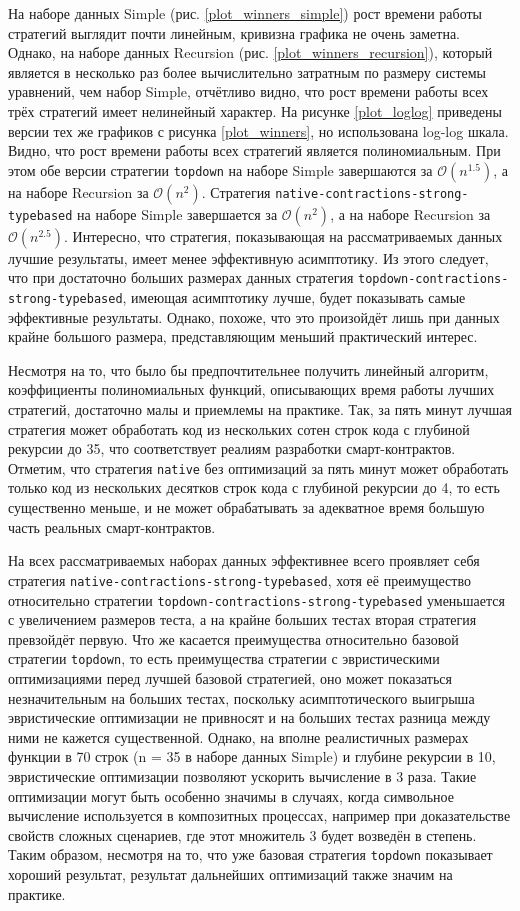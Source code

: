 \documentclass[../thesis.tex]{subfiles}
\begin{document}
На наборе данных Simple (рис. \ref{plot_winners_simple}) рост времени работы стратегий выглядит почти линейным, кривизна графика не очень заметна. Однако, на наборе данных Recursion (рис. \ref{plot_winners_recursion}), который является в несколько раз более вычислительно затратным по размеру системы уравнений, чем набор Simple, отчётливо видно, что рост времени работы всех трёх стратегий имеет нелинейный характер. На рисунке \ref{plot_loglog} приведены версии тех же графиков с рисунка \ref{plot_winners}, но использована log-log шкала. Видно, что рост времени работы всех стратегий является полиномиальным. При этом обе версии стратегии \texttt{topdown} на наборе Simple завершаются за $\mathcal{O}(n^{1.5})$, а на наборе Recursion за $\mathcal{O}(n^2)$. Стратегия \texttt{native-contractions-strong-typebased} на наборе Simple завершается за $\mathcal{O}(n^2)$, а на наборе Recursion за $\mathcal{O}(n^{2.5})$. Интересно, что стратегия, показывающая на рассматриваемых данных лучшие результаты, имеет менее эффективную асимптотику. Из этого следует, что при достаточно больших размерах данных стратегия \texttt{topdown-contractions-strong-typebased}, имеющая асимптотику лучше, будет показывать самые эффективные результаты. Однако, похоже, что это произойдёт лишь при данных крайне большого размера, представляющим меньший практический интерес.

Несмотря на то, что было бы предпочтительнее получить линейный алгоритм, коэффициенты полиномиальных функций, описывающих время работы лучших стратегий, достаточно малы и приемлемы на практике. Так, за пять минут лучшая стратегия может обработать код из нескольких сотен строк кода с глубиной рекурсии до 35, что соответствует реалиям разработки смарт-контрактов. Отметим, что стратегия \texttt{native} без оптимизаций за пять минут может обработать только код из нескольких десятков строк кода с глубиной рекурсии до 4, то есть существенно меньше, и не может обрабатывать за адекватное время большую часть реальных смарт-контрактов.

На всех рассматриваемых наборах данных эффективнее всего проявляет себя стратегия \texttt{native-contractions-strong-typebased}, хотя её преимущество относительно стратегии \texttt{topdown-contractions-strong-typebased} уменьшается с увеличением размеров теста, а на крайне больших тестах вторая стратегия превзойдёт первую. Что же касается преимущества относительно базовой стратегии \texttt{topdown}, то есть преимущества стратегии с эвристическими оптимизациями перед лучшей базовой стратегией, оно может показаться незначительным на больших тестах, поскольку асимптотического выигрыша эвристические оптимизации не привносят и на больших тестах разница между ними не кажется существенной. Однако, на вполне реалистичных размерах функции в 70 строк (n = 35 в наборе данных Simple) и глубине рекурсии в 10, эвристические оптимизации позволяют ускорить вычисление в 3 раза. Такие оптимизации могут быть особенно значимы в случаях, когда символьное вычисление используется в композитных процессах, например при доказательстве свойств сложных сценариев, где этот множитель 3 будет возведён в степень. Таким образом, несмотря на то, что уже базовая стратегия \texttt{topdown} показывает хороший результат, результат дальнейших оптимизаций также значим на практике.
\end{document}
